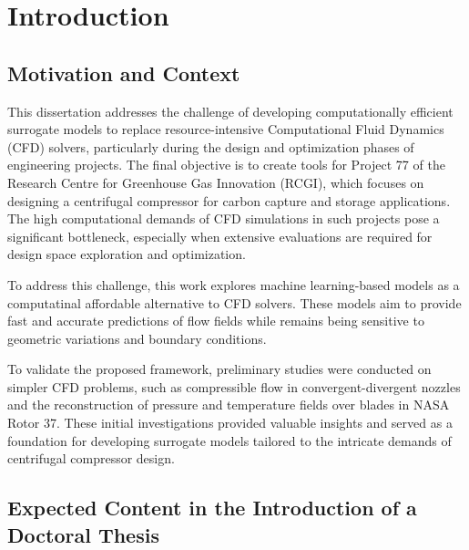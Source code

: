 \documentclass[dscexam, EN]{ufabcFHZh}
\begin{document}
\tableofcontents
\listoffigures
\listoftables

\chapter{Introduction}

\section{Motivation and Context}

This dissertation addresses the challenge of developing computationally efficient surrogate models to replace resource-intensive Computational Fluid Dynamics (CFD) solvers, particularly during the design and optimization phases of engineering projects. The final objective is to create tools for Project 77 of the Research Centre for Greenhouse Gas Innovation (RCGI), which focuses on designing a centrifugal compressor for carbon capture and storage applications. The high computational demands of CFD simulations in such projects pose a significant bottleneck, especially when extensive evaluations are required for design space exploration and optimization.

To address this challenge, this work explores machine learning-based models as a computatinal affordable alternative to CFD solvers. These models aim to provide fast and accurate predictions of flow fields while remains being sensitive to geometric variations and boundary conditions. 

To validate the proposed framework, preliminary studies were conducted on simpler CFD problems, such as compressible flow in convergent-divergent nozzles and the reconstruction of pressure and temperature fields over blades in NASA Rotor 37. These initial investigations provided valuable insights and served as a foundation for developing surrogate models tailored to the intricate demands of centrifugal compressor design.

\section{Expected Content in the Introduction of a Doctoral Thesis}
\end{document}
